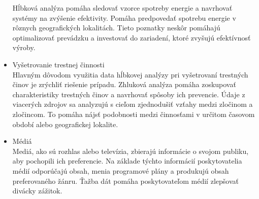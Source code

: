 \documentclass[10pt,twoside,slovak,a4paper]{article}
\begin{document}
\begin{itemize}
Hĺbková analýza pomáha sledovať vzorce spotreby energie a navrhovať systémy na zvýšenie efektivity. Pomáha predpovedať spotrebu energie v rôznych geografických lokalitách. Tieto poznatky neskôr pomáhajú optimalizovať prevádzku a investovať do zariadení, ktoré zvyšujú efektívnosť výroby.
\item Vyšetrovanie trestnej činnosti\\
Hlavným dôvodom využitia data hĺbkovej analýzy pri vyšetrovaní trestných činov je zrýchliť riešenie prípadu. Zhluková analýza pomáha zoskupovať charakteristiky trestných činov a navrhovať spôsoby ich prevencie. Údaje z viacerých zdrojov sa analyzujú s cieľom zjednodušiť vzťahy medzi zločinom a zločincom. To pomáha nájsť podobnosti medzi činnosťami v určitom časovom období alebo geografickej lokalite.
\item Médiá\\
Mediá, ako sú rozhlas alebo televízia, zbierajú informácie o svojom publiku, aby pochopili ich preferencie. Na základe týchto informácií poskytovatelia médií odporúčajú obsah, menia programové plány a produkujú obsah preferovaného žánru. Ťažba dát pomáha poskytovateľom médií zlepšovať divácky zážitok.\cite{IET}
\end{itemize}





\end{document}
